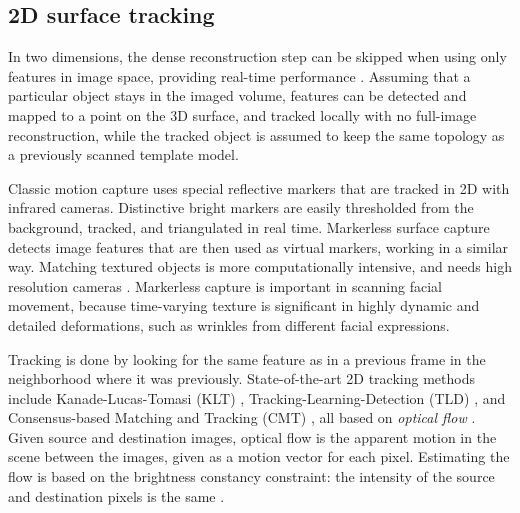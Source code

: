 
\subsection{2D surface tracking} %


In two dimensions, the dense reconstruction step can be skipped when using only features in image space, providing real-time performance \cite{pilet2005real}.
Assuming that a particular object stays in the imaged volume, features can be detected and mapped to a point on the 3D surface, and tracked locally with no full-image reconstruction, while the tracked object is assumed to keep the same topology as a previously scanned template model.


Classic motion capture uses special reflective markers that are tracked in 2D with infrared cameras.
Distinctive bright markers are easily thresholded from the background, tracked, and triangulated in real time.
Markerless surface capture detects image features that are then used as virtual markers, working in a similar way.
Matching textured objects is more computationally intensive, and needs high resolution cameras \cite{moeslund2001survey}.
Markerless capture is important in scanning facial movement, because time-varying texture is significant in highly dynamic and detailed deformations, such as wrinkles from different facial expressions.
\cite{bradley2008markerless,beeler2011high,bradley2010high}

Tracking is done by looking for the same feature as in a previous frame in the neighborhood where it was previously.
State-of-the-art 2D tracking methods include Kanade-Lucas-Tomasi (KLT) \cite{lucas1981iterative,tomasi1991detection}, Tracking-Learning-Detection (TLD) \cite{kalal2012tracking}, and Consensus-based Matching and Tracking (CMT) \cite{nebehay2014consensus}, all based on \emph{optical flow} \cite{horn1981determining,gibson1950perception,beauchemin1995computation}.
Given source and destination images, optical flow is the apparent motion in the scene between the images, given as a motion vector for each pixel.
Estimating the flow is based on the brightness constancy constraint: the intensity of the source and destination pixels is the same \cite{horn1974determining}.

